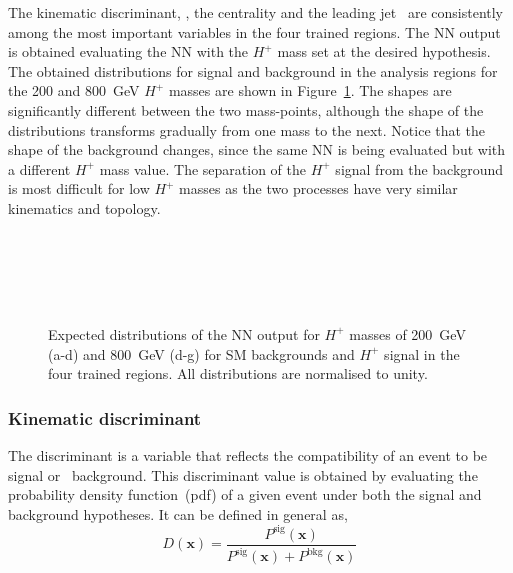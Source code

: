 The kinematic discriminant, \HTjets, the centrality and the leading jet \pT\ are consistently among the most important variables in the four trained regions. The NN output is obtained evaluating the NN with the $H^+$ mass set at the desired hypothesis. The obtained distributions for signal and background in the analysis regions for the 200 and 800~GeV $H^+$ masses are shown in Figure~\ref{Hplustb:NNshapes}. The shapes are significantly different between the two mass-points, although the shape of the distributions transforms gradually from one mass to the next. Notice that the shape of the background changes, since the same NN is being evaluated but with a different $H^+$ mass value. The separation of the $H^+$ signal from the background is most difficult for low $H^+$ masses as the two processes have very similar kinematics and topology.

\begin{figure}[htb]
    \RawFloats
    \centering
     \\
     \\
     \\
     \\
    \caption{Expected distributions of the NN output for $H^+$ masses of 200~GeV (a-d)
    and 800~GeV (d-g) for SM backgrounds and $H^+$ signal in the four trained regions.
    All distributions are normalised to unity.
    }
    \label{Hplustb:NNshapes}
\end{figure}
\clearpage
\subsubsection{Kinematic discriminant}

The discriminant is a variable that reflects the compatibility of an event to be signal or \ttbar\ background. This discriminant value is obtained by evaluating the probability density function~(pdf) of a given event under both the signal and background hypotheses. It can be defined in general as,
\begin{equation}
    D(\textbf{x})=\frac{P^{\text{sig}}(\textbf{x})}{P^{\text{sig}}(\textbf{x})+P^{\text{bkg}}(\textbf{x})}
    \label{eq3:discriminant}
\end{equation}

